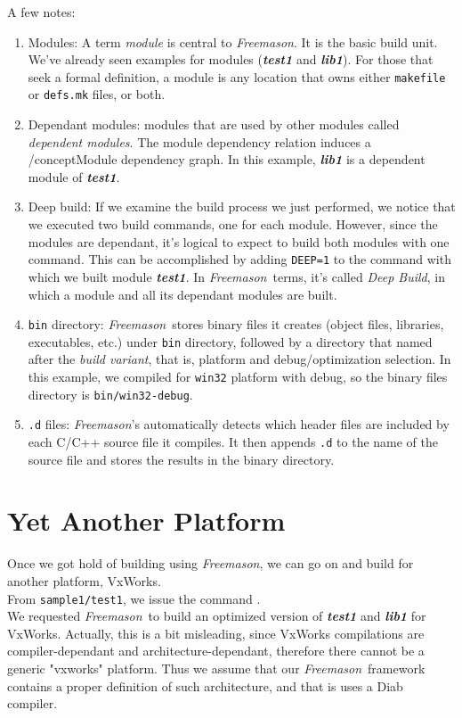 \documentclass[a4paper]{article}
\newcommand{\freemason}{\textit{Freemason}}
\newcommand{\nameb}[1]{\textbf{\emph{#1}}}
\newcommand{\concept}[1]{\textit{#1}}
\begin{document}
A few notes:
\begin{enumerate}
    \item Modules: A term \concept{module} is central to \freemason. It is the basic build unit. We've already seen examples for modules (\nameb{test1} and \nameb{lib1}). For those that seek a formal definition, a module is any location that owns either \verb"makefile" or \verb"defs.mk" files, or both.

    \item Dependant modules: modules that are used by other modules called \concept{dependent modules}. The module dependency relation induces
        a /concept{Module dependency graph}. In this example, \nameb{lib1} is a dependent module of \nameb{test1}.

    \item Deep build: If we examine the build process we just performed, we notice that we executed two build commands, one for each module. However, since the modules are dependant, it's logical to expect to build both modules with one command. This can be accomplished by adding \verb"DEEP=1" to the command with which we built module \nameb{test1}. In \freemason\ terms, it's called \concept{Deep Build}, in which a module and all its dependant modules are built.

    \item \verb"bin" directory: \freemason\ stores binary files it creates (object files, libraries, executables, etc.) under \verb"bin" directory,
        followed by a directory that named after the \concept{build variant}, that is, platform and debug/optimization selection. In this example,
        we compiled for \verb"win32" platform with debug, so the binary files directory is \verb"bin/win32-debug".

    \item \verb".d" files: \freemason's automatically detects which header files are included by each C/C++ source file it compiles. It then appends \verb".d" to the name of the source file and stores the results in the binary directory.
\end{enumerate}

\newpage

\section{Yet Another Platform}

Once we got hold of building using \freemason, we can go on and build for another platform, VxWorks.
\\
From \verb"sample1/test1", we issue the command .
\\
We requested \freemason\ to build an optimized version of \nameb{test1} and \nameb{lib1} for VxWorks.
Actually, this is a bit misleading, since VxWorks compilations are compiler-dependant and architecture-dependant,
therefore there cannot be a generic "vxworks" platform. Thus we assume that our \freemason\ framework contains
a proper definition of such architecture, and that is uses a Diab compiler.
\end{document}
